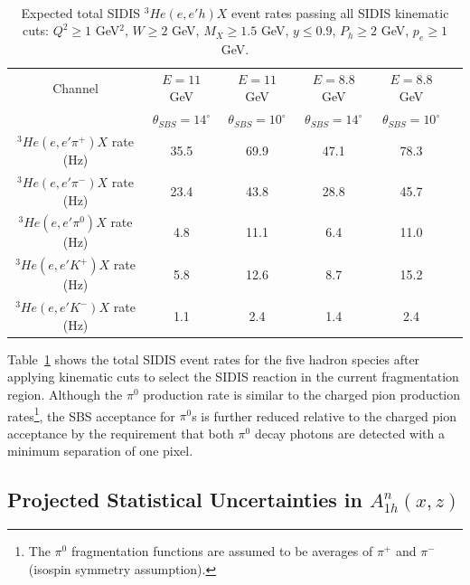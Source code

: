 \paragraph{}
\begin{table}[h]
  \caption{\label{RateTable} Expected total SIDIS $^3He(e,e'h)X$ event rates passing all SIDIS kinematic cuts: $Q^2 \ge 1$ GeV$^2$, $W \ge 2$ GeV, $M_X \ge 1.5$ GeV, $y \le 0.9$, $P_h \ge 2$ GeV, $p_e \ge 1$ GeV.}
  \begin{center}
    \begin{tabular}{cccccc}
      \hline \hline
      Channel & $E = 11$ GeV & $E = 11$ GeV & $E = 8.8$ GeV & $E=8.8$ GeV \\ 
      & $\theta_{SBS} = 14^\circ$ & $\theta_{SBS}=10^\circ$ & $\theta_{SBS} = 14^\circ$ & $\theta_{SBS} = 10^\circ$ \\ \hline 
      $^3He(e,e'\pi^+)X$ rate (Hz) & 35.5 & 69.9 & 47.1 & 78.3 \\ 
      $^3He(e,e'\pi^-)X$ rate (Hz) & 23.4 & 43.8 & 28.8 & 45.7 \\
      $^3He(e,e'\pi^0)X$ rate (Hz) & 4.8 & 11.1 & 6.4 & 11.0 \\
      $^3He(e,e'K^+)X$ rate (Hz) & 5.8 & 12.6 & 8.7 & 15.2 \\
      $^3He(e,e'K^-)X$ rate (Hz) & 1.1 & 2.4 & 1.4 & 2.4 \\ \hline \hline 
    \end{tabular}
  \end{center}
\end{table}
Table~\ref{RateTable} shows the total SIDIS event rates for the five hadron species after applying kinematic cuts to select the SIDIS reaction in the current fragmentation region. Although the $\pi^0$ production rate is similar to the charged pion production rates\footnote{The $\pi^0$ fragmentation functions are assumed to be averages of $\pi^+$ and $\pi^-$ (isospin symmetry assumption).}, the SBS acceptance for $\pi^0$s is further reduced relative to the charged pion acceptance by the requirement that both $\pi^0$ decay photons are detected with a minimum separation of one pixel.
\subsection{Projected Statistical Uncertainties in $A_{1h}^n(x,z)$}
